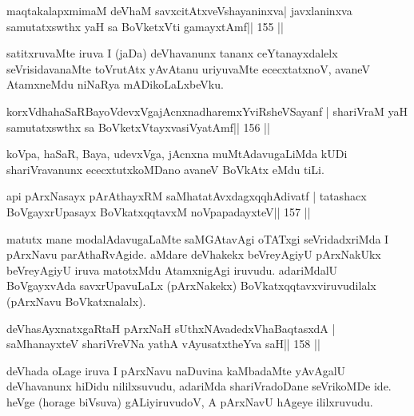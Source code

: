\begin{shl}
maqtakalapxmimaM deVhaM savxcitAtxveVshayaninxva\footnotemark[7] |
javxlaninxva samutatxswthx yaH sa BoVketxVti gamayxtAmf\hfill || 155 ||
\end{shl}

\begin{artha}
satitxruvaMte iruva I (jaDa) deVhavanunx tananx ceYtanayxdalelx  seVrisidavanaMte toVrutAtx yAvAtanu uriyuvaMte ececxtatxnoV, avaneV AtamxneMdu niNaRya mADikoLaLxbeVku.
\end{artha}

\begin{shl}
korxVdhahaSaRBayoVdevxVgajAcnxnadharemxYviRsheVSayanf |
shariVraM yaH samutatxswthx sa BoVketxVtayxvasiVyatAmf\hfill || 156 ||
\end{shl}

\begin{artha}
koVpa, haSaR, Baya, udevxVga, jAcnxna muMtAdavugaLiMda kUDi 
shariVravanunx ececxtutxkoMDano avaneV BoVkAtx eMdu tiLi.
\end{artha}


\begin{shl}
api pArxNasayx pArAthayxRM saMhatatAvxdagxqqhAdivatf |
tatashacx BoVgayxrUpasayx BoVkatxqqtavxM noVpapadayxteV\hfill || 157 ||
\end{shl}

\begin{artha}
matutx mane modalAdavugaLaMte saMGAtavAgi oTATxgi seVridadxriMda I  pArxNavu parAthaRvAgide. aMdare deVhakekx beVreyAgiyU pArxNakUkx  beVreyAgiyU iruva matotxMdu AtamxnigAgi iruvudu. adariMdalU BoVgayxvAda savxrUpavuLaLx (pArxNakekx) BoVkatxqqtavxviruvudilalx (pArxNavu BoVkatxnalalx).
\end{artha}


\begin{shl}
deVhasAyxnatxgaRtaH pArxNaH sUthxNAvadedxVhaBaqtasxdA |
saMhanayxteV shariVreVNa yathA vAyusatxtheYva saH\hfill || 158 ||
\end{shl}

\begin{artha}
deVhada oLage iruva I pArxNavu naDuvina kaMbadaMte yAvAgalU deVhavanunx  hiDidu nililxsuvudu, adariMda shariVradoDane seVrikoMDe ide. heVge (horage biVsuva) gALiyiruvudoV, A pArxNavU hAgeye ililxruvudu.
\end{artha}

